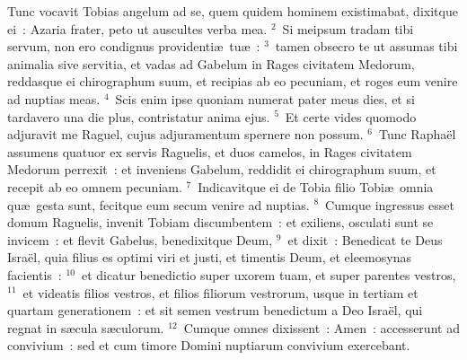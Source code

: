 \lettrine[lines=10,image=true,loversize=0.05,lraise=-0.03]{T}{}unc vocavit Tobias angelum ad se, quem quidem hominem existimabat, dixitque ei~: Azaria frater, peto ut auscultes verba mea.
${}^{2}$~Si meipsum tradam tibi servum, non ero condignus providenti\ae\ tu\ae~:
${}^{3}$~tamen obsecro te ut assumas tibi animalia sive servitia, et vadas ad Gabelum in Rages civitatem Medorum, reddasque ei chirographum suum, et recipias ab eo pecuniam, et roges eum venire ad nuptias meas.
${}^{4}$~Scis enim ipse quoniam numerat pater meus dies, et si tardavero una die plus, contristatur anima ejus.
${}^{5}$~Et certe vides quomodo adjuravit me Raguel, cujus adjuramentum spernere non possum.
${}^{6}$~Tunc Rapha\"el assumens quatuor ex servis Raguelis, et duos camelos, in Rages civitatem Medorum perrexit~: et inveniens Gabelum, reddidit ei chirographum suum, et recepit ab eo omnem pecuniam.
${}^{7}$~Indicavitque ei de Tobia filio Tobi\ae\ omnia qu\ae\ gesta sunt, fecitque eum secum venire ad nuptias.
${}^{8}$~Cumque ingressus esset domum Raguelis, invenit Tobiam discumbentem~: et exiliens, osculati sunt se invicem~: et flevit Gabelus, benedixitque Deum,
${}^{9}$~et dixit~: Benedicat te Deus Isra\"el, quia filius es optimi viri et justi, et timentis Deum, et eleemosynas facientis~:
${}^{10}$~et dicatur benedictio super uxorem tuam, et super parentes vestros,
${}^{11}$~et videatis filios vestros, et filios filiorum vestrorum, usque in tertiam et quartam generationem~: et sit semen vestrum benedictum a Deo Isra\"el, qui regnat in s\ae cula s\ae culorum.
${}^{12}$~Cumque omnes dixissent~: Amen~: accesserunt ad convivium~: sed et cum timore Domini nuptiarum convivium exercebant.


